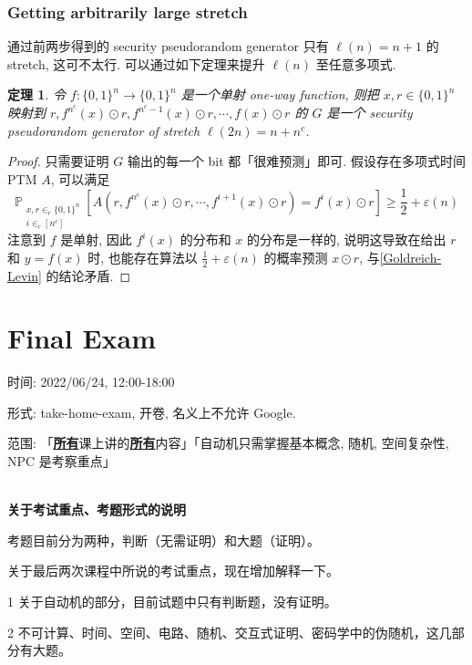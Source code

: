 \documentclass[8pt]{article}
\theoremstyle{compact}
\newtheorem{theorem}{定理}[section]
\def\obj#1{\textbf{\uline{#1}}}
\def\ge{\geqslant}
\begin{document}
\subsubsection{Getting arbitrarily large stretch}

通过前两步得到的 security pseudorandom generator 只有 $\ell(n) = n + 1$ 的 stretch, 这可不太行. 可以通过如下定理来提升 $\ell(n)$ 至任意多项式.

\begin{theorem}
	令 $f: \{0, 1\}^n \to \{0, 1\}^n$ 是一个单射 one-way function, 则把 $x, r \in \{0, 1\}^n$ 映射到 $r, f^{n^c}(x) \odot r, f^{n^c-1}(x) \odot r, \cdots, f(x) \odot r$ 的 $G$ 是一个 security pseudorandom generator of stretch $\ell(2n) = n + n^c$.
\end{theorem}
\begin{proof}
	只需要证明 $G$ 输出的每一个 bit 都「很难预测」即可. 假设存在多项式时间 PTM $A$, 可以满足 $$\mathbb P_{\substack{x, r \in_r \{0, 1\}^n \\ i \in_r [n^c]}}[A(r, f^{n^c}(x) \odot r, \cdots, f^{i+1}(x)\odot r) = f^i(x) \odot r] \ge \frac12 + \varepsilon(n)$$ 注意到 $f$ 是单射, 因此 $f^i(x)$ 的分布和 $x$ 的分布是一样的, 说明这导致在给出 $r$ 和 $y = f(x)$ 时, 也能存在算法以 $\frac12 + \varepsilon(n)$ 的概率预测 $x \odot r$, 与\cref{Goldreich-Levin} 的结论矛盾.
\end{proof}

\newpage
\section{Final Exam}
时间: 2022/06/24, 12:00-18:00

形式: take-home-exam, 开卷, 名义上不允许 Google.

范围: 「\obj{所有}课上讲的\obj{所有}内容」「自动机只需掌握基本概念, 随机, 空间复杂性, NPC 是考察重点」

~\\

\textbf{关于考试重点、考题形式的说明}

考题目前分为两种，判断（无需证明）和大题（证明）。

关于最后两次课程中所说的考试重点，现在增加解释一下。

1 关于自动机的部分，目前试题中只有判断题，没有证明。

2 不可计算、时间、空间、电路、随机、交互式证明、密码学中的伪随机，这几部分有大题。 
\end{document}
